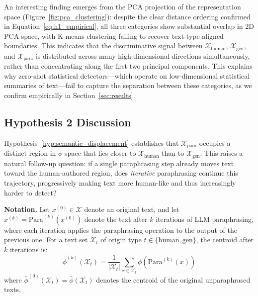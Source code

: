 \documentclass[runningheads]{llncs}
\begin{document}
\noindent An interesting finding emerges from the PCA projection of 
the representation space (Figure~\ref{fig:pca_clustering}): despite 
the clear distance ordering confirmed in Equation~\ref{eq:h1_empirical}, 
all three categories show substantial overlap in 2D PCA space, with 
K-means clustering failing to recover text-type-aligned boundaries. 
This indicates that the discriminative signal between 
$\mathcal{X}_{\text{human}}$, $\mathcal{X}_{\text{gen}}$, and 
$\mathcal{X}_{\text{para}}$ is distributed across many high-dimensional 
directions simultaneously, rather than concentrating along the first 
two principal components. This explains why zero-shot statistical 
detectors---which operate on low-dimensional statistical summaries of 
text---fail to capture the separation between these categories, as we 
confirm empirically in Section~\ref{sec:results}.

\subsection{Hypothesis 2 Discussion}
\noindent Hypothesis~\ref{hyp:semantic_displacement} establishes that 
$\mathcal{X}_{\text{para}}$ occupies a distinct region in $\phi$-space 
that lies closer to $\mathcal{X}_{\text{human}}$ than to 
$\mathcal{X}_{\text{gen}}$. This raises a natural follow-up question: 
if a single paraphrasing step already moves text toward the human-authored 
region, does \textit{iterative} paraphrasing continue this trajectory, 
progressively making text more human-like and thus increasingly harder 
to detect?

\noindent\textbf{Notation.} Let $x^{(0)} \in \mathcal{X}$ denote an 
original text, and let $x^{(k)} = \text{Para}^{(k)}(x^{(0)})$ denote 
the text after $k$ iterations of LLM paraphrasing, where each iteration 
applies the paraphrasing operation to the output of the previous one. 
For a text set $\mathcal{X}_t$ of origin type $t \in \{\text{human}, 
\text{gen}\}$, the centroid after $k$ iterations is:
\begin{equation}
    \bar{\phi}^{(k)}(\mathcal{X}_t) = \frac{1}{|\mathcal{X}_t|}
    \sum_{x \in \mathcal{X}_t} \phi\!\left(\text{Para}^{(k)}(x)\right)
    \label{eq:iterative_centroid}
\end{equation}
where $\bar{\phi}^{(0)}(\mathcal{X}_t) = \bar{\phi}(\mathcal{X}_t)$ 
denotes the centroid of the original unparaphrased texts.
\end{document}

